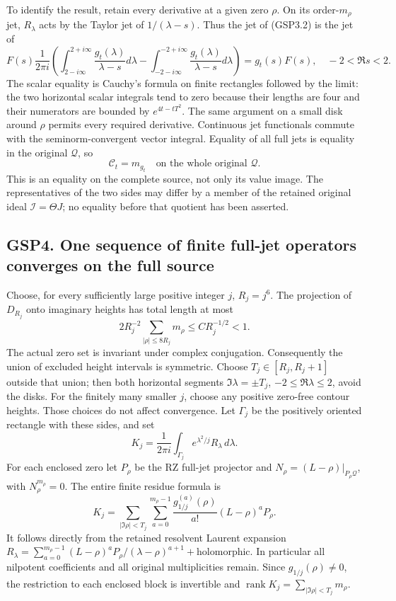To identify the result, retain every derivative at a given zero
\(\rho\). On its order-\(m_\rho\) jet, \(R_\lambda\) acts by the Taylor
jet of \(1/(\lambda-s)\). Thus the jet of (GSP3.2) is the jet of \[
F(s)\frac1{2\pi i}\left(
\int_{2-i\infty}^{2+i\infty}\frac{g_t(\lambda)}{\lambda-s}d\lambda
-\int_{-2-i\infty}^{-2+i\infty}\frac{g_t(\lambda)}{\lambda-s}d\lambda
\right)
=g_t(s)F(s),\quad -2<\Re s<2.
\tag{GSP3.3}
\] The scalar equality is Cauchy's formula on finite rectangles followed
by the limit: the two horizontal scalar integrals tend to zero because
their lengths are four and their numerators are bounded by
\(e^{4t-tT^2}\). The same argument on a small disk around \(\rho\)
permits every required derivative. Continuous jet functionals commute
with the seminorm-convergent vector integral. Equality of all full jets
is equality in the original \(\mathcal Q\), so \[
\boxed{\mathcal C_t=m_{g_t}\quad\text{on the whole original }\mathcal Q.}
\tag{GSP3.4}
\] This is an equality on the complete source, not only its value image.
The representatives of the two sides may differ by a member of the
retained original ideal \(\mathcal I=\Theta J\); no equality before that
quotient has been asserted.

\subsection{GSP4. One sequence of finite full-jet operators converges on
the full
source}\label{gsp4.-one-sequence-of-finite-full-jet-operators-converges-on-the-full-source}

Choose, for every sufficiently large positive integer \(j\),
\(R_j=j^6\). The projection of \(D_{R_j}\) onto imaginary heights has
total length at most \[
2R_j^{-2}\sum_{|\rho|\le8R_j}m_\rho\le C R_j^{-1/2}<1.
\tag{GSP4.1}
\] The actual zero set is invariant under complex conjugation.
Consequently the union of excluded height intervals is symmetric. Choose
\(T_j\in[R_j,R_j+1]\) outside that union; then both horizontal segments
\(\Im\lambda=\pm T_j\), \(-2\le\Re\lambda\le2\), avoid the disks. For
the finitely many smaller \(j\), choose any positive zero-free contour
heights. Those choices do not affect convergence. Let \(\Gamma_j\) be
the positively oriented rectangle with these sides, and set \[
K_j=\frac1{2\pi i}\int_{\Gamma_j}e^{\lambda^2/j}R_\lambda\,d\lambda.
\tag{GSP4.2}
\] For each enclosed zero let \(P_\rho\) be the RZ full-jet projector
and \(N_\rho=(L-\rho)|_{P_\rho\mathcal Q}\), with \(N_\rho^{m_\rho}=0\).
The entire finite residue formula is \[
K_j=\sum_{|\Im\rho|<T_j}\sum_{a=0}^{m_\rho-1}
\frac{g_{1/j}^{(a)}(\rho)}{a!}(L-\rho)^aP_\rho.
\tag{GSP4.3}
\] It follows directly from the retained resolvent Laurent expansion
\(R_\lambda=\sum_{a=0}^{m_\rho-1}(L-\rho)^aP_\rho/(\lambda-\rho)^{a+1}+\text{holomorphic}\).
In particular all nilpotent coefficients and all original multiplicities
remain. Since \(g_{1/j}(\rho)\ne0\), the restriction to each enclosed
block is invertible and
\(\operatorname{rank}K_j=\sum_{|\Im\rho|<T_j}m_\rho\).

